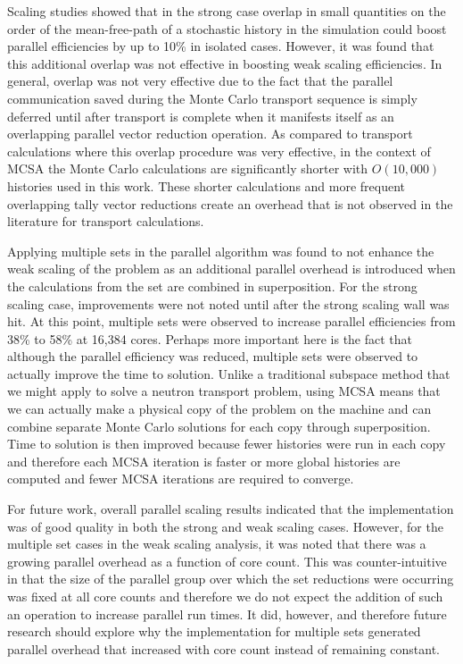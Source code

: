 \documentclass{snamc2013}
\begin{document}
Scaling studies showed that in the strong case overlap in small
quantities on the order of the mean-free-path of a stochastic history
in the simulation could boost parallel efficiencies by up to 10\% in
isolated cases. However, it was found that this additional overlap was
not effective in boosting weak scaling efficiencies. In general,
overlap was not very effective due to the fact that the parallel
communication saved during the Monte Carlo transport sequence is
simply deferred until after transport is complete when it manifests
itself as an overlapping parallel vector reduction operation. As
compared to transport calculations where this overlap procedure was
very effective, in the context of MCSA the Monte Carlo calculations
are significantly shorter with $O(10,000)$ histories used in this
work. These shorter calculations and more frequent overlapping tally
vector reductions create an overhead that is not observed in the
literature for transport calculations.

Applying multiple sets in the parallel algorithm was found to not
enhance the weak scaling of the problem as an additional parallel
overhead is introduced when the calculations from the set are combined
in superposition. For the strong scaling case, improvements were not
noted until after the strong scaling wall was hit. At this point,
multiple sets were observed to increase parallel efficiencies from
38\% to 58\% at 16,384 cores. Perhaps more important here is the fact
that although the parallel efficiency was reduced, multiple sets were
observed to actually improve the time to solution. Unlike a
traditional subspace method that we might apply to solve a neutron
transport problem, using MCSA means that we can actually make a
physical copy of the problem on the machine and can combine separate
Monte Carlo solutions for each copy through superposition. Time to
solution is then improved because fewer histories were run in each
copy and therefore each MCSA iteration is faster or more global
histories are computed and fewer MCSA iterations are required to
converge.

For future work, overall parallel scaling results indicated that the
implementation was of good quality in both the strong and weak scaling
cases. However, for the multiple set cases in the weak scaling
analysis, it was noted that there was a growing parallel overhead as a
function of core count. This was counter-intuitive in that the size of
the parallel group over which the set reductions were occurring was
fixed at all core counts and therefore we do not expect the addition
of such an operation to increase parallel run times. It did, however,
and therefore future research should explore why the implementation
for multiple sets generated parallel overhead that increased with core
count instead of remaining constant.
\end{document}
